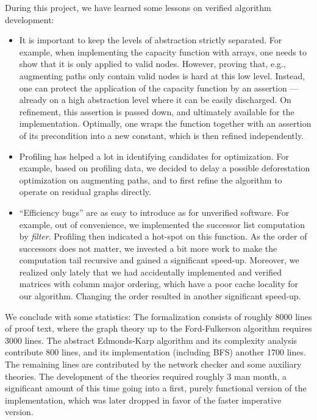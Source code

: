 \documentclass{llncs}
\begin{document}
  During this project, we have learned some lessons on verified algorithm development: 
  \begin{itemize}
  \item It is important to keep the levels of abstraction strictly separated.
    For example, when implementing the capacity function with arrays, one needs to show that it is only applied to valid nodes.
    However, proving that, e.g., augmenting paths only contain valid nodes is hard at this low level. 
    Instead, one can protect the application of the capacity function by an assertion --- already on a high abstraction level where it can be easily discharged. 
    On refinement, this assertion is passed down, and ultimately available for the implementation.
    Optimally, one wraps the function together with an assertion of its precondition into a new constant, which is then refined independently.
  \item Profiling has helped a lot in identifying candidates for optimization. For example, based on profiling data, we decided to delay a 
    possible deforestation optimization on augmenting paths, and to first refine the algorithm to operate on residual graphs directly.
  \item ``Efficiency bugs'' are as easy to introduce as for unverified software. For example, out of convenience, we implemented the successor list computation by
    \emph{filter}. Profiling then indicated a hot-spot on this function. As the order of successors does not matter, we invested a bit more work to make the computation tail 
    recursive and gained a significant speed-up. Moreover, we realized only lately that we had accidentally implemented and verified
    matrices with column major ordering, which have a poor cache locality for our algorithm. Changing the order resulted in another significant speed-up.
  \end{itemize}
  
  We conclude with some statistics:
  The formalization consists of roughly 8000 lines of proof text, where the graph theory up to the Ford-Fulkerson algorithm requires 3000 lines.
  The abstract Edmonds-Karp algorithm and its complexity analysis contribute 800 lines, and its implementation (including BFS) another 1700 lines.
  The remaining lines are contributed by the network checker and some auxiliary theories. The development of the theories required roughly 3 man month, a significant amount of this time going into a first, purely functional version of the implementation, which was later dropped in favor of the faster imperative version.
  
\end{document}
